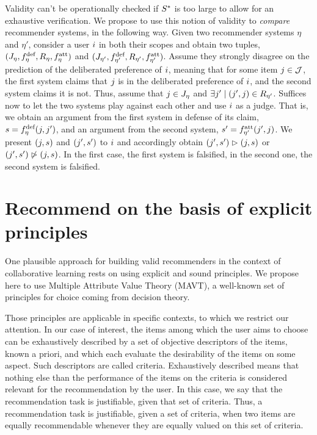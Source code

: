 \documentclass[french, english]{da2pl2018}
\begin{document}
Validity can’t be operationally checked if $\allargs$ is too large to allow for an exhaustive verification. We propose to use this notion of validity to \emph{compare} recommender systems, in the following way. Given two recommender systems $\eta$ and $\eta'$, consider a user $\usr$ in both their scopes and obtain two tuples, $(\mitems, \mdef, R_\eta, \matt)$ and $(\mitems[\eta'], \mdef[\eta'], R_{\eta'}, \matt[\eta'])$. Assume they strongly disagree on the prediction of the deliberated preference of $\usr$, meaning that for some item $\itm \in \allitems$, the first system claims that $\itm$ is in the deliberated preference of $\usr$, and the second system claims it is not. Thus, assume that $\itm \in \mitems$ and $\exists \itm' \suchthat (\itm', \itm) \in R_{\eta'}$. Suffices now to let the two systems play against each other and use $\usr$ as a judge. That is, we obtain an argument from the first system in defense of its claim, $\ar = \mdef(\itm, \itm')$, and an argument from the second system, $\ar' = \matt[\eta'](\itm', \itm)$. We present $(\itm, \ar)$ and $(\itm', \ar')$ to $\usr$ and accordingly obtain $(\itm', \ar') \ibeats (\itm, \ar)$ or $(\itm', \ar') \nibeats (\itm, \ar)$. In the first case, the first system is falsified, in the second one, the second system is falsified.

\section{Recommend on the basis of explicit principles}
One plausible approach for building valid recommenders in the context of collaborative learning rests on using explicit and sound principles. We propose here to use Multiple Attribute Value Theory (MAVT), a well-known set of principles for choice coming from decision theory.

Those principles are applicable in specific contexts, to which we restrict our attention. In our case of interest, the items among which the user aims to choose can be exhaustively described by a set of objective descriptors of the items, known a priori, and which each evaluate the desirability of the items on some aspect. Such descriptors are called criteria. Exhaustively described means that nothing else than the performance of the items on the criteria is considered relevant for the recommendation by the user. In this case, we say that the recommendation task is justifiable, given that set of criteria. Thus, a recommendation task is justifiable, given a set of criteria, when two items are equally recommendable whenever they are equally valued on this set of criteria.
\end{document}
